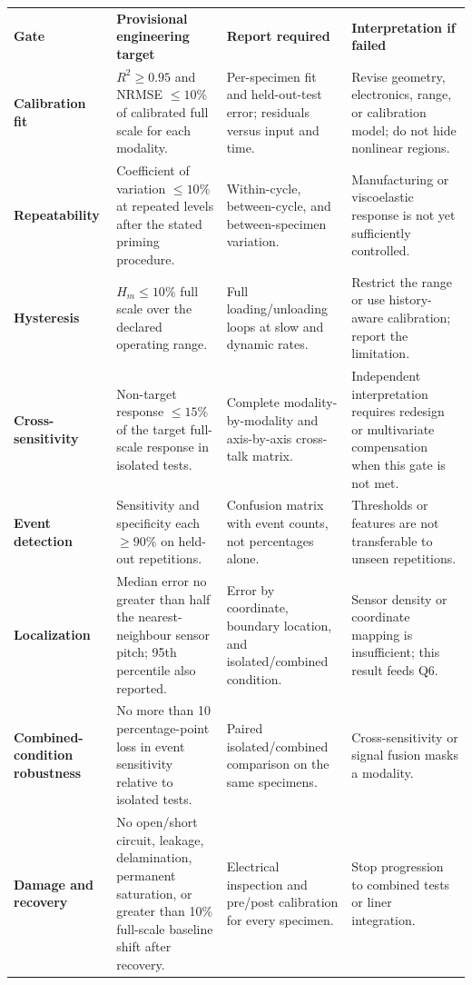 \begingroup
\fontsize{8.25}{9.7}\selectfont
\setlength{\tabcolsep}{3pt}
\renewcommand{\arraystretch}{1.12}
\begin{tabularx}{\linewidth}{>{\raggedright\arraybackslash\bfseries\color{AUBRed}}p{3.2cm}
                            >{\raggedright\arraybackslash}p{4.1cm}Y Y}
\color{white}\textbf{Gate} &
\color{white}\textbf{Provisional engineering target} &
\color{white}\textbf{Report required} &
\color{white}\textbf{Interpretation if failed} \\
Calibration fit & $R^2\ge0.95$ and NRMSE $\le10\%$ of calibrated full scale
for each modality. & Per-specimen fit and held-out-test error; residuals versus
input and time. & Revise geometry, electronics, range, or calibration model;
do not hide nonlinear regions. \\
Repeatability & Coefficient of variation $\le10\%$ at repeated levels after
the stated priming procedure. & Within-cycle, between-cycle, and
between-specimen variation. & Manufacturing or viscoelastic response is not
yet sufficiently controlled. \\
Hysteresis & $H_m\le10\%$ full scale over the declared operating range. & Full
loading/unloading loops at slow and dynamic rates. & Restrict the range or use
history-aware calibration; report the limitation. \\
Cross-sensitivity & Non-target response $\le15\%$ of the target full-scale
response in isolated tests. & Complete modality-by-modality and axis-by-axis
cross-talk matrix. & Independent interpretation requires redesign or
multivariate compensation when this gate is not met. \\
Event detection & Sensitivity and specificity each $\ge90\%$ on held-out
repetitions. & Confusion matrix with event counts, not percentages alone. &
Thresholds or features are not transferable to unseen repetitions. \\
Localization & Median error no greater than half the nearest-neighbour sensor
pitch; 95th percentile also reported. & Error by coordinate, boundary location,
and isolated/combined condition. & Sensor density or coordinate mapping is
insufficient; this result feeds Q6. \\
Combined-condition robustness & No more than 10 percentage-point loss in event
sensitivity relative to isolated tests. & Paired isolated/combined comparison
on the same specimens. & Cross-sensitivity or signal fusion masks a modality. \\
Damage and recovery & No open/short circuit, leakage, delamination, permanent
saturation, or greater than 10\% full-scale baseline shift after recovery. &
Electrical inspection and pre/post calibration for every specimen. & Stop
progression to combined tests or liner integration. \\
\end{tabularx}
\endgroup

